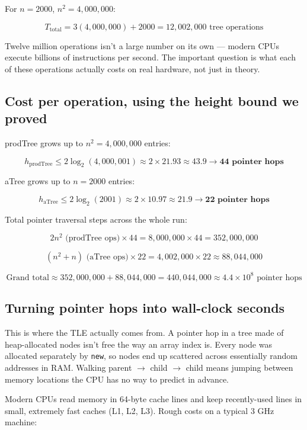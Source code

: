 \documentclass[11pt,a4paper]{article}
\begin{document}
For $n = 2000$, $n^2 = 4{,}000{,}000$:


\[
T_{\text{total}} = 3(4{,}000{,}000) + 2000 = 12{,}002{,}000 \text{ tree operations}
\]


Twelve million operations isn't a large number on its own --- modern CPUs execute billions of instructions per second. The important question is what each of these operations actually costs on real hardware, not just in theory.

\subsection{Cost per operation, using the height bound we proved}

prodTree grows up to $n^2 = 4{,}000{,}000$ entries:


\[
h_{\text{prodTree}} \le 2\log_2(4{,}000{,}001) \approx 2 \times 21.93 \approx 43.9 \rightarrow \textbf{44 pointer hops}
\]


aTree grows up to $n = 2000$ entries:


\[
h_{\text{aTree}} \le 2\log_2(2001) \approx 2 \times 10.97 \approx 21.9 \rightarrow \textbf{22 pointer hops}
\]


Total pointer traversal steps across the whole run:


\[
2n^2 \text{ (prodTree ops)} \times 44 = 8{,}000{,}000 \times 44 = 352{,}000{,}000
\]



\[
(n^2+n)\text{ (aTree ops)} \times 22 = 4{,}002{,}000 \times 22 \approx 88{,}044{,}000
\]



\[
\text{Grand total} \approx 352{,}000{,}000 + 88{,}044{,}000 = 440{,}044{,}000 \approx 4.4 \times 10^8 \text{ pointer hops}
\]


\subsection{Turning pointer hops into wall-clock seconds}

This is where the TLE actually comes from. A pointer hop in a tree made of heap-allocated nodes isn't free the way an array index is. Every node was allocated separately by \texttt{new}, so nodes end up scattered across essentially random addresses in RAM. Walking parent $\rightarrow$ child $\rightarrow$ child means jumping between memory locations the CPU has no way to predict in advance.

Modern CPUs read memory in 64-byte cache lines and keep recently-used lines in small, extremely fast caches (L1, L2, L3). Rough costs on a typical 3 GHz machine:
\end{document}
